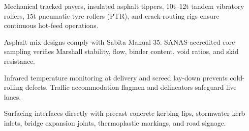 \noindent
\begin{minipage}[t]{0.485\textwidth}
    \begin{tcolorbox}[enhanced, colback=white, colframe=mhlightgray, boxrule=0.8pt, arc=4pt, title={\bfseries\color{white}\faTruckMonster\ Surfacing Plant Logistics}, colbacktitle=mhnavy, left=8pt, right=8pt, top=7pt, bottom=7pt, drop shadow=black!4]
        {\fontsize{8.1pt}{11.3pt}\selectfont\color{mhtext}
        Mechanical tracked pavers, insulated asphalt tippers, 10t--12t tandem vibratory rollers, 15t pneumatic tyre rollers (PTR), and crack-routing rigs ensure continuous hot-feed operations.
        }
    \end{tcolorbox}
\end{minipage}
\hfill
\begin{minipage}[t]{0.485\textwidth}
    \begin{tcolorbox}[enhanced, colback=white, colframe=mhlightgray, boxrule=0.8pt, arc=4pt, title={\bfseries\color{white}\faFlask\ Laboratory Mix Verification}, colbacktitle=mhblue, left=8pt, right=8pt, top=7pt, bottom=7pt, drop shadow=black!4]
        {\fontsize{8.1pt}{11.3pt}\selectfont\color{mhtext}
        Asphalt mix designs comply with Sabita Manual 35. SANAS-accredited core sampling verifies Marshall stability, flow, binder content, void ratios, and skid resistance.
        }
    \end{tcolorbox}
\end{minipage}

\vspace{0.18cm}

\noindent
\begin{minipage}[t]{0.485\textwidth}
    \begin{tcolorbox}[enhanced, colback=white, colframe=mhlightgray, boxrule=0.8pt, arc=4pt, title={\bfseries\color{white}\faThermometerHalf\ Thermal \& Site Safety Control}, colbacktitle=mhnavy, left=8pt, right=8pt, top=7pt, bottom=7pt, drop shadow=black!4]
        {\fontsize{8.1pt}{11.3pt}\selectfont\color{mhtext}
        Infrared temperature monitoring at delivery and screed lay-down prevents cold-rolling defects. Traffic accommodation flagmen and delineators safeguard live lanes.
        }
    \end{tcolorbox}
\end{minipage}
\hfill
\begin{minipage}[t]{0.485\textwidth}
    \begin{tcolorbox}[enhanced, colback=white, colframe=mhlightgray, boxrule=0.8pt, arc=4pt, title={\bfseries\color{white}\faRoad\ Interfaced Civil Road Scope}, colbacktitle=mhblue, left=8pt, right=8pt, top=7pt, bottom=7pt, drop shadow=black!4]
        {\fontsize{8.1pt}{11.3pt}\selectfont\color{mhtext}
        Surfacing interfaces directly with precast concrete kerbing lips, stormwater kerb inlets, bridge expansion joints, thermoplastic markings, and road signage.
        }
    \end{tcolorbox}
\end{minipage}

